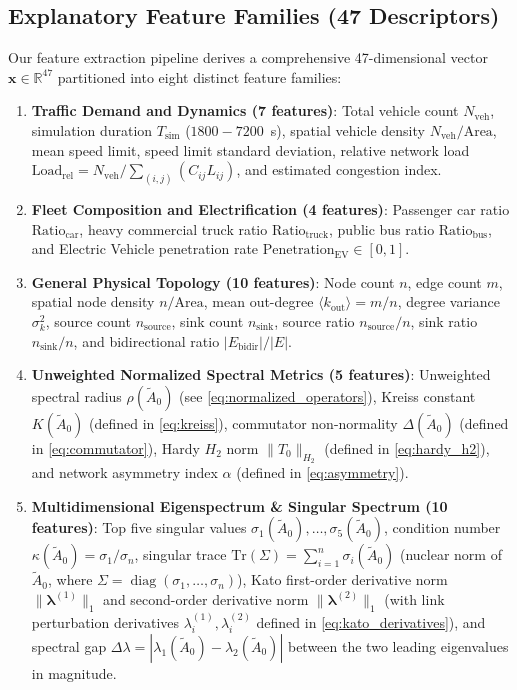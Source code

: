 \documentclass[journal]{IEEEtran}
\begin{document}
\subsection{Explanatory Feature Families (47 Descriptors)}
Our feature extraction pipeline derives a comprehensive 47-dimensional vector $\mathbf{x} \in \mathbb{R}^{47}$ partitioned into eight distinct feature families:
\begin{enumerate}
    \item \textbf{Traffic Demand and Dynamics (7 features)}: Total vehicle count $N_{\text{veh}}$, simulation duration $T_{\text{sim}}$ ($1800 - 7200$~s), spatial vehicle density $N_{\text{veh}}/\text{Area}$, mean speed limit, speed limit standard deviation, relative network load $\text{Load}_{\text{rel}} = N_{\text{veh}} / \sum_{(i,j)} (C_{ij} L_{ij})$, and estimated congestion index.
    \item \textbf{Fleet Composition and Electrification (4 features)}: Passenger car ratio $\text{Ratio}_{\text{car}}$, heavy commercial truck ratio $\text{Ratio}_{\text{truck}}$, public bus ratio $\text{Ratio}_{\text{bus}}$, and Electric Vehicle penetration rate $\text{Penetration}_{\text{EV}} \in [0, 1]$.
    \item \textbf{General Physical Topology (10 features)}: Node count $n$, edge count $m$, spatial node density $n/\text{Area}$, mean out-degree $\langle k_{\text{out}} \rangle = m/n$, degree variance $\sigma_k^2$, source count $n_{\text{source}}$, sink count $n_{\text{sink}}$, source ratio $n_{\text{source}}/n$, sink ratio $n_{\text{sink}}/n$, and bidirectional ratio $|E_{\text{bidir}}|/|E|$.
    \item \textbf{Unweighted Normalized Spectral Metrics (5 features)}: Unweighted spectral radius $\rho(\tilde{A}_0)$ (see \eqref{eq:normalized_operators}), Kreiss constant $K(\tilde{A}_0)$ (defined in \eqref{eq:kreiss}), commutator non-normality $\Delta(\tilde{A}_0)$ (defined in \eqref{eq:commutator}), Hardy $H_2$ norm $\|T_0\|_{H_2}$ (defined in \eqref{eq:hardy_h2}), and network asymmetry index $\alpha$ (defined in \eqref{eq:asymmetry}).
    \item \textbf{Multidimensional Eigenspectrum \& Singular Spectrum (10 features)}: Top five singular values $\sigma_1(\tilde{A}_0), \dots, \sigma_5(\tilde{A}_0)$, condition number $\kappa(\tilde{A}_0) = \sigma_1/\sigma_n$, singular trace $\text{Tr}(\Sigma) = \sum_{i=1}^n \sigma_i(\tilde{A}_0)$ (nuclear norm of $\tilde{A}_0$, where $\Sigma = \operatorname{diag}(\sigma_1, \dots, \sigma_n)$), Kato first-order derivative norm $\|\boldsymbol{\lambda}^{(1)}\|_1$ and second-order derivative norm $\|\boldsymbol{\lambda}^{(2)}\|_1$ (with link perturbation derivatives $\lambda_i^{(1)}, \lambda_i^{(2)}$ defined in \eqref{eq:kato_derivatives}), and spectral gap $\Delta\lambda = |\lambda_1(\tilde{A}_0) - \lambda_2(\tilde{A}_0)|$ between the two leading eigenvalues in magnitude.

\end{enumerate}
\end{document}
